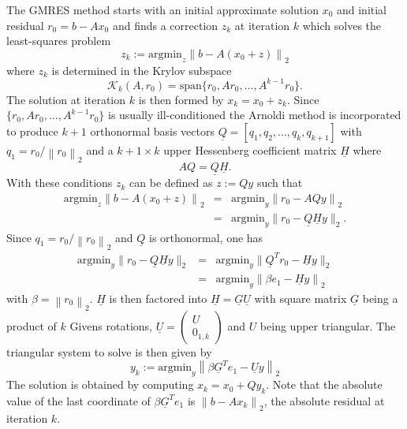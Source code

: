 \documentclass{scrartcl}
\newcommand{\norm}[1]{\left\lVert#1\right\rVert}
\begin{document}
The GMRES method starts with an initial approximate solution $x_0$ and initial residual $r_0 = b - Ax_0$ and finds a correction $z_k$ at iteration $k$ which solves the least-squares problem 
\begin{equation}
	z_k := \text{argmin}_{z} \norm{b - A(x_0 + z)}_2
\end{equation}
where $z_k$ is determined in the Krylov subspace 
\begin{equation*}
	 \mathcal{K}_k(A, r_0) = \text{span}\{r_0, Ar_0, \ldots, A^{k-1}r_0\}.
\end{equation*}
The solution at iteration $k$ is then formed by $x_k = x_0 + z_k$.
Since $\{r_0, Ar_0, \ldots, A^{k-1}r_0\}$ is usually ill-conditioned the Arnoldi method is incorporated to produce $k + 1$ orthonormal basis vectors $\underline{Q} = [q_1, q_2, \ldots, q_k, q_{k + 1}]$ with $q_1 = r_0/\norm{r_0}_2$ and a $k + 1 \times k$ upper Hessenberg coefficient matrix $\underline{H}$ where
\begin{equation*}
	AQ = \underline{Q}\underline{H}.
\end{equation*}
With these conditions $z_k$ can be defined as $z := Qy$ such that 
\begin{eqnarray*}
	\text{argmin}_{z} \norm{b - A(x_0 + z)}_2 &=& \text{argmin}_y \norm{r_0 - AQy}_2 \\
	 &=& \text{argmin}_{y} \lVert r_0 - \underline{Q} \underline{H} y \rVert_2.
\end{eqnarray*}
Since $q_1 = r_0/\norm{r_0}_2$ and $\underline{Q}$ is orthonormal, one has
\begin{eqnarray} \label{eq:stdgmreslsp}
	\text{argmin}_y \lVert r_0 - \underline{Q} \underline{H} y \rVert_2 &=& \text{argmin}_{y} \lVert \underline{Q}^T r_0 - \underline{H} y \rVert_2 \nonumber \\
	&=& \text{argmin}_{y} \norm{\beta e_1 - \underline{H} y}_2 
\end{eqnarray}
with $\beta = \norm{r_0}_2$.
$\underline{H}$ is then factored into $\underline{H} = \underline{G}\underline{U}$ with square matrix $\underline{G}$ being a product of $k$ Givens rotations, $\underline{U} = 
\begin{pmatrix}
	U \\
	0_{1, k}
\end{pmatrix}$
and $U$ being upper triangular. The triangular system to solve is then given by
\begin{equation*}
	y_k := \text{argmin}_y \norm{\beta \underline{G}^T e_1 - \underline{U} y}_2
\end{equation*}
The solution is obtained by computing $x_k = x_0 + Qy_k$. Note that the absolute value of the last coordinate of $\beta \underline{G}^T e_1$ is $\norm{b - Ax_k}_2$, the absolute residual at iteration $k$. \\
\end{document}

